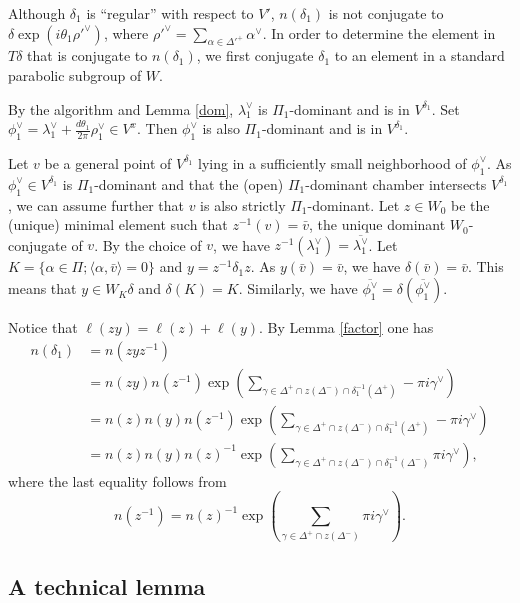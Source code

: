 \documentclass[12pt,leqno]{article}
\renewcommand{\a}{\mathfrak a}
\newcommand{\g}{\mathfrak g}
\def\a{\alpha}
\def\g{\gamma}
\def\d{\delta}
\def\D{\Delta}
\def\th{\theta}
\def\l{\lambda}
\def\i{^{-1}}
\begin{document}
Although $\d_1$ is ``regular'' with respect to $V'$, $n(\d_1)$ is not conjugate to $\d \exp(i \th_1 {\rho'}^\vee)$, where ${\rho'}^\vee=\sum_{\a \in {\D'}^+} \a^\vee$. In order to determine the element in $T \d$ that is conjugate to $n(\d_1)$, we first conjugate $\d_1$ to an element in a standard parabolic subgroup of $W$.

By the algorithm and Lemma \ref{dom}, $\l_1^\vee$ is $\Pi_1$-dominant and is in $V^{\d_1}$. Set $\phi_1^\vee = \l_1^\vee + \frac{d \th_1}{2 \pi}\rho_1^\vee \in V^x$. Then $\phi_1^\vee$ is also $\Pi_1$-dominant and is in $V^{\d_1}$.

Let $v$ be a general point of $V^{\d_1}$ lying in a sufficiently small neighborhood of $\phi_1^\vee$. As $\phi_1^\vee \in V^{\d_1}$ is $\Pi_1$-dominant and that the (open) $\Pi_1$-dominant chamber intersects $V^{\d_1}$, we can assume further that $v$ is also strictly $\Pi_1$-dominant. Let $z \in W_0$ be the (unique) minimal element such that $z\i(v) = \bar v$, the unique dominant $W_0$-conjugate of $v$. By the choice of $v$, we have $z^{-1}(\l_1^\vee)=\overline{\l_1^\vee}$. Let $K=\{\a \in \Pi; \langle\a, \bar v\rangle=0\}$ and $y = z^{-1} \d_1 z$. As $y(\bar v)=\bar v$, we have $\d(\bar v)=\bar v$. This means that $y \in W_K \d$ and $\d(K)=K$. Similarly, we have $\overline{\phi_1^\vee} = \d(\overline{\phi_1^\vee})$.

Notice that $\ell(z y)=\ell(z) + \ell(y)$. By Lemma \ref{factor} one has \begin{align*} n(\d_1) &= n(z y z^{-1}) \\ &= n(z y) n(z^{-1}) \exp(\sum_{\g \in \D^+ \cap z(\D^-) \cap \d_1 \i (\D^+)} -\pi i \g^\vee) \\ &= n(z) n(y) n(z^{-1}) \exp(\sum_{\g \in \D^+ \cap z(\D^-) \cap \d_1 \i (\D^+)} -\pi i \g^\vee) \\ &= n(z) n(y) n(z)^{-1} \exp(\sum_{\g \in \D^+ \cap z(\D^-) \cap \d_1 \i(\D^-)} \pi i \g^\vee), \end{align*} where the last equality follows from $$n(z^{-1})=n(z)^{-1} \exp(\sum_{\g \in \D^+ \cap z(\D^-)} \pi i \g^\vee).$$

\subsection{A technical lemma}
\end{document}
